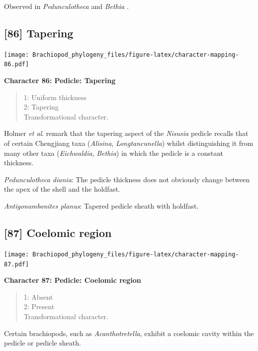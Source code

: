 \documentclass[]{book}
\theoremstyle{definition}
\theoremstyle{definition}
\theoremstyle{definition}
\theoremstyle{remark}
\begin{document}
Observed in \emph{Pedunculotheca} and \emph{Bethia}
\citep{Sutton2005Silurianbrachiopods}.

\hypertarget{tapering}{%
\subsection*{{[}86{]} Tapering}\label{tapering}}

\texttt{[image: Brachiopod\_phylogeny\_files/figure-latex/character-mapping-86.pdf]}

\textbf{Character 86: Pedicle: Tapering}

\begin{quote}
1: Uniform thickness\\
2: Tapering\\
Transformational character.
\end{quote}

Holmer \emph{et al}. \citeyearpar{Holmer2018Theattachment} remark that
the tapering aspect of the \emph{Nisusia} pedicle recalls that of
certain Chengjiang taxa (\emph{Alisina}, \emph{Longtancunella}) whilst
distinguishing it from many other taxa (\emph{Eichwaldia},
\emph{Bethia}) in which the pedicle is a constant thickness.

\emph{Pedunculotheca diania}: The pedicle thickness does not obviously
change between the apex of the shell and the holdfast.

\emph{Antigonambonites planus}: Tapered pedicle sheath with holdfast.

\hypertarget{coelomic-region}{%
\subsection*{{[}87{]} Coelomic region}\label{coelomic-region}}

\texttt{[image: Brachiopod\_phylogeny\_files/figure-latex/character-mapping-87.pdf]}

\textbf{Character 87: Pedicle: Coelomic region}

\begin{quote}
1: Absent\\
2: Present\\
Transformational character.
\end{quote}

Certain brachiopods, such as \emph{Acanthotretella}, exhibit a coelomic
cavity within the pedicle or pedicle sheath.
\end{document}
